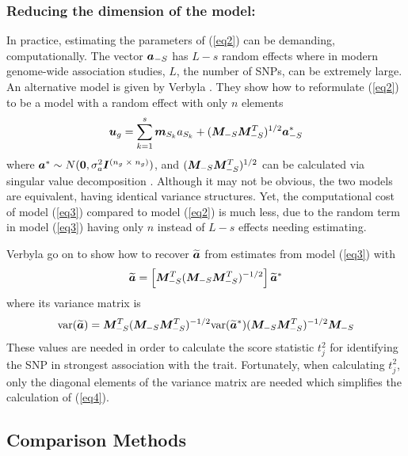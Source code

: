 \documentclass{article}
\begin{document}
\subsubsection {Reducing the dimension of the model:} 

In practice, estimating the parameters of (\ref{eq2}) can be demanding, computationally. 
The vector $\bm{a}_{-S}$ has $L-s$ random effects where in modern genome-wide association studies, 
$L$, the number of SNPs, can be extremely large.  An alternative model is given by 
Verbyla \citep{verbyla2012rwgaim,verbyla2014whole}. 
They show how to reformulate (\ref{eq2}) to be a model with a random effect with only $n$ elements
\begin{equation}
\label{eq3}
\bm{u}_g = \sum_{k=1}^s  \bm{m}_{S_k} a_{S_k} + (\bm{M}_{-S} \bm{M}_{-S}^T)^{1/2} \bm{a}^*_{-S}
\end{equation}
where $\bm{a}^* \sim N(\bm{0}, \sigma_a^2 \bm{I}^{(n_g \; \times \;  n_g)})$, and 
$(\bm{M}_{-S} \bm{M}_{-S}^T)^{1/2}$ can be calculated via singular value decomposition \citep{golub2012matrix}.  
Although it may not be obvious, the two models are equivalent, 
having identical variance structures. Yet, the computational cost of model (\ref{eq3}) compared to 
model (\ref{eq2}) is much less, due to the random term in model (\ref{eq3}) having only $n$ instead of $L-s$ 
effects needing estimating. 

Verbyla \citep{verbyla2012rwgaim,verbyla2014whole} go on to show how to recover $\widetilde{\bm{a}}$ from estimates from model  (\ref{eq3})  with 
\begin{equation}
\widetilde{\bm{a}} = \left [ \bm{M}_{-S}^T (\bm{M}_{-S} \bm{M}_{-S}^T)^{-1/2} \right ] \widetilde{\bm{a}}^*
\end{equation}
where its variance matrix is
\begin{equation}
\label{eq4}
\textrm{var}(\widetilde{\bm{a}}) = \bm{M}_{-S}^T (\bm{M}_{-S} \bm{M}_{-S}^T)^{-1/2} \textrm{var}(\widetilde{\bm{a}}^*) (\bm{M}_{-S} \bm{M}_{-S}^T)^{-1/2} \bm{M}_{-S}
\end{equation}
These values are needed in order to calculate the score statistic $t_j^2$ for identifying the SNP in strongest association with the trait. 
Fortunately, when calculating $t_j^2$, only the diagonal elements of the variance matrix are needed which simplifies the  calculation 
of (\ref{eq4}). 


\subsection{Comparison Methods}
\end{document}
